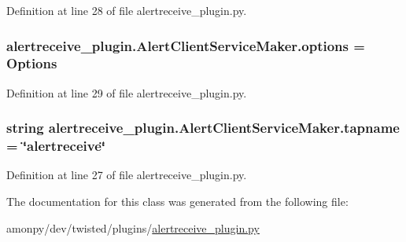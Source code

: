 Definition at line 28 of file alertreceive\-\_\-plugin.\-py.

\hypertarget{classalertreceive__plugin_1_1_alert_client_service_maker_a602e325f18585e9ee7d01055df4c4977}{
\subsubsection[{options}]{\setlength{\rightskip}{0pt plus 5cm}alertreceive\-\_\-plugin.\-Alert\-Client\-Service\-Maker.\-options = {\bf Options}\hspace{0.3cm}{\ttfamily [static]}}}\label{classalertreceive__plugin_1_1_alert_client_service_maker_a602e325f18585e9ee7d01055df4c4977}


Definition at line 29 of file alertreceive\-\_\-plugin.\-py.

\hypertarget{classalertreceive__plugin_1_1_alert_client_service_maker_aa06203843a8e49cf4a4e3ce3bb0e9674}{
\subsubsection[{tapname}]{\setlength{\rightskip}{0pt plus 5cm}string alertreceive\-\_\-plugin.\-Alert\-Client\-Service\-Maker.\-tapname = \char`\"{}alertreceive\char`\"{}\hspace{0.3cm}{\ttfamily [static]}}}\label{classalertreceive__plugin_1_1_alert_client_service_maker_aa06203843a8e49cf4a4e3ce3bb0e9674}


Definition at line 27 of file alertreceive\-\_\-plugin.\-py.



The documentation for this class was generated from the following file\-:\begin{DoxyCompactItemize}
\item 
amonpy/dev/twisted/plugins/\hyperlink{alertreceive__plugin_8py}{alertreceive\-\_\-plugin.\-py}\end{DoxyCompactItemize}
